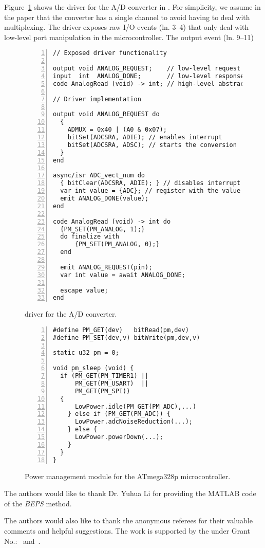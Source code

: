 Figure~\ref{lst.adc} shows the driver for the A/D converter in \CEU.
For simplicity, we assume in the paper that the converter has a single channel
to avoid having to deal with multiplexing.
%
The driver exposes raw I/O events (ln. 3--4) that only deal with low-level
port manipulation in the microcontroller.
The output event (ln. 9--11)

\begin{figure}[t]
\begin{lstlisting}[numbers=left]
// Exposed driver functionality

output void ANALOG_REQUEST;    // low-level request
input  int  ANALOG_DONE;       // low-level response
code AnalogRead (void) -> int; // high-level abstraction

// Driver implementation

output void ANALOG_REQUEST do
  {
    ADMUX = 0x40 | (A0 & 0x07);
    bitSet(ADCSRA, ADIE); // enables interrupt
    bitSet(ADCSRA, ADSC); // starts the conversion
  }
end

async/isr ADC_vect_num do
  { bitClear(ADCSRA, ADIE); } // disables interrupt
  var int value = {ADC}; // register with the value read
  emit ANALOG_DONE(value);
end

code AnalogRead (void) -> int do
  {PM_SET(PM_ANALOG, 1);}
  do finalize with
      {PM_SET(PM_ANALOG, 0);}
  end

  emit ANALOG_REQUEST(pin);
  var int value = await ANALOG_DONE;

  escape value;
end
\end{lstlisting}
\caption{ \CEU driver for the A/D converter.
\label{lst.adc}
}
\end{figure}

\begin{figure}[t]
\begin{lstlisting}[numbers=left]
#define PM_GET(dev)   bitRead(pm,dev)
#define PM_SET(dev,v) bitWrite(pm,dev,v)

static u32 pm = 0;

void pm_sleep (void) {
  if (PM_GET(PM_TIMER1) ||
      PM_GET(PM_USART)  ||
      PM_GET(PM_SPI))
  {
      LowPower.idle(PM_GET(PM_ADC),...)
    } else if (PM_GET(PM_ADC)) {
      LowPower.adcNoiseReduction(...);
    } else {
      LowPower.powerDown(...);
    }
  }
}
\end{lstlisting}
\caption{ Power management module for the ATmega328p microcontroller.
\label{lst.pm}
}
\end{figure}


\begin{acks}
  The authors would like to thank Dr. Yuhua Li for providing the
  MATLAB code of the \textit{BEPS} method.

  The authors would also like to thank the anonymous referees for
  their valuable comments and helpful suggestions. The work is
  supported by the  under Grant
  No.:~
  and~.

\end{acks}
